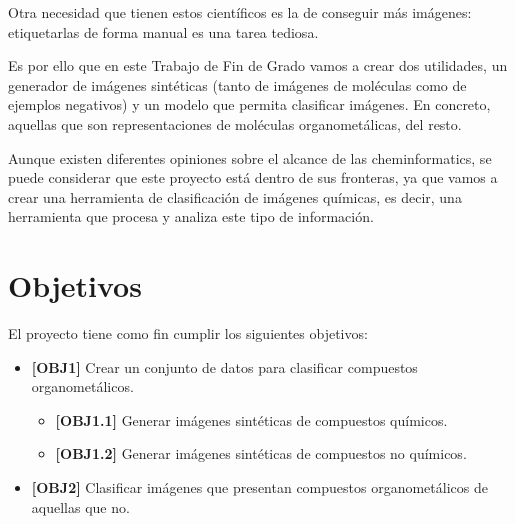 Otra necesidad que tienen estos científicos es la de conseguir más imágenes: etiquetarlas de forma manual es una tarea tediosa.

Es por ello que en este Trabajo de Fin de Grado vamos a crear dos utilidades, un generador de imágenes sintéticas (tanto de imágenes de moléculas como de ejemplos negativos) y un modelo que permita clasificar imágenes. En concreto, aquellas que son representaciones de moléculas organometálicas, del resto.

Aunque existen diferentes opiniones sobre el alcance de las cheminformatics, se puede considerar que este proyecto está dentro de sus fronteras, ya que vamos a crear una herramienta de clasificación de imágenes químicas, es decir, una herramienta que procesa y analiza este tipo de información.

\section{Objetivos}
El proyecto tiene como fin cumplir los siguientes objetivos:

\begin{itemize}
    \item \textbf{[OBJ1]} Crear un conjunto de datos para clasificar compuestos organometálicos.
    \begin{itemize}
        \item \textbf{[OBJ1.1]} Generar imágenes sintéticas de compuestos químicos.
        \item \textbf{[OBJ1.2]} Generar imágenes sintéticas de compuestos no químicos.
    \end{itemize}
    \item \textbf{[OBJ2]} Clasificar imágenes que presentan compuestos organometálicos de aquellas que no.
\end{itemize}